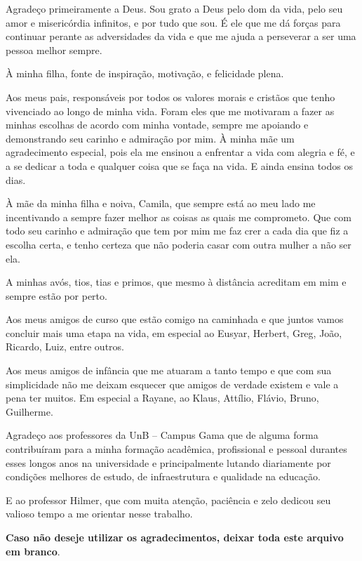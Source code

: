 \begin{agradecimentos}
Agradeço primeiramente a Deus. Sou grato a Deus pelo dom da vida, pelo seu amor e misericórdia infinitos, e por tudo que sou. É ele que me dá forças para continuar perante as adversidades da vida e que me ajuda a perseverar a ser uma pessoa melhor sempre.

À minha filha, fonte de inspiração, motivação, e felicidade plena.

Aos meus pais, responsáveis por todos os valores morais e cristãos que tenho vivenciado ao longo de minha vida. Foram eles que me motivaram a fazer as minhas escolhas de acordo com minha vontade, sempre me apoiando e demonstrando seu carinho e admiração por mim. À minha mãe um agradecimento especial, pois ela me ensinou a enfrentar a vida com alegria e fé, e a se dedicar a toda e qualquer coisa que se faça na vida. E ainda ensina todos os dias.

À mãe da minha filha e noiva, Camila, que sempre está ao meu lado me incentivando a sempre fazer melhor as coisas as quais me comprometo. Que com todo seu carinho e admiração que tem por mim me faz crer a cada dia que fiz a escolha certa, e tenho certeza que não poderia casar com outra mulher a não ser ela.

A minhas avós, tios, tias e primos, que mesmo à distância acreditam em mim e sempre estão por perto.

Aos meus amigos de curso que estão comigo na caminhada e que juntos 
vamos concluir mais uma etapa na vida, em especial ao Eusyar, Herbert, Greg, João, Ricardo, Luiz, entre outros.

Aos meus amigos de infância que me atuaram a tanto tempo e que com sua simplicidade não me deixam esquecer que amigos de verdade existem e vale a pena ter muitos. Em especial a Rayane, ao Klaus, Attílio, Flávio, Bruno, Guilherme.

Agradeço aos professores da UnB – Campus Gama que de alguma forma contribuíram para a minha formação acadêmica, profissional e pessoal durantes esses longos anos na universidade e principalmente lutando diariamente por condições melhores de estudo, de infraestrutura e qualidade na educação.

E ao professor Hilmer, que com muita atenção, paciência e zelo dedicou seu valioso tempo a me orientar nesse trabalho.

\textbf{Caso não deseje utilizar os agradecimentos, deixar toda este arquivo
em branco}.
\end{agradecimentos}
